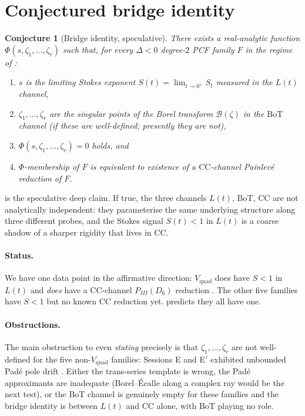 \documentclass[11pt,reqno]{amsart}
\theoremstyle{plain}
\newtheorem{conjecture}[theorem]{Conjecture}
\theoremstyle{definition}
\theoremstyle{remark}
\newcommand{\Lt}{L(t)}
\newcommand{\BoT}{\mathrm{BoT}}
\newcommand{\CC}{\mathrm{CC}}
\newcommand{\Vquad}{V_{\mathrm{quad}}}
\newcommand{\Borel}{\mathcal{B}}
\begin{document}
\section{Conjectured bridge identity}
\label{sec:bridge}

\begin{conjecture}[Bridge identity, speculative]
\label{conj:bridge}
There exists a real-analytic function
$\Phi(s, \zeta_1, \ldots, \zeta_r)$ such that, for every
$\Delta<0$ degree-$2$ PCF family $F$ in the regime of
:
\begin{enumerate}[label=(\roman*)]
\item $s$ is the limiting Stokes exponent
$S(t) = \lim_{t \to 0^+} S_t$ measured in the $\Lt$
channel,
\item $\zeta_1, \ldots, \zeta_r$ are the singular points of
the Borel transform $\Borel(\zeta)$ in the $\BoT$ channel
(if these are well-defined; presently they are not),
\item $\Phi(s, \zeta_1, \ldots, \zeta_r) = 0$ holds, and
\item $\Phi$-membership of $F$ is equivalent to existence of
a $\CC$-channel Painlev\'e reduction of $F$.
\end{enumerate}
\end{conjecture}

 is the speculative deep claim. If true, the
three channels $\Lt$, $\BoT$, $\CC$ are not analytically
independent: they parameterise the same underlying structure
along three different probes, and the Stokes signal $S(t)<1$
in $\Lt$ is a coarse shadow of a sharper rigidity that lives
in $\CC$.

\paragraph{Status.} We have one data point in the affirmative
direction: $\Vquad$ does have $S < 1$ in $\Lt$
\cite{siarc_pcf1_v13} and \emph{does} have a $\CC$-channel
$P_{III}(D_6)$ reduction \cite{iwasaki1991from}. The other
five families have $S<1$ but no known $\CC$ reduction yet.
 predicts they all have one.

\paragraph{Obstructions.} The main obstruction to even
\emph{stating}  precisely is that
$\zeta_1, \ldots, \zeta_r$ are not well-defined for the five
non-$\Vquad$ families: Sessions E and E$'$ exhibited unbounded
Pad\'e pole drift \cite{siarc_borel_5x, siarc_borel_kscan}.
Either the trans-series template is wrong, the Pad\'e
approximants are inadequate (Borel--\'Ecalle along a complex
ray would be the next test), or the $\BoT$ channel is genuinely
empty for these families and the bridge identity is between
$\Lt$ and $\CC$ alone, with $\BoT$ playing no role.
\end{document}
